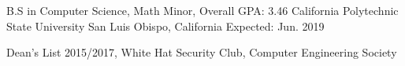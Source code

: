 


\begin{cventries}


\cventry
{B.S in Computer Science, Math Minor, Overall GPA: 3.46} %
{California Polytechnic State University} %
{San Luis Obispo, California} %
{Expected: Jun. 2019} %
{ %
\begin{cvitems}
\item {Dean's List 2015/2017, White Hat Security Club, Computer Engineering Society }
\end{cvitems}
}


\end{cventries}
